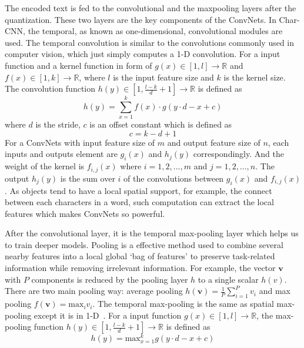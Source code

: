 The encoded text is fed to the convolutional and the maxpooling layers after the quantization. These two layers are the key components of the ConvNets. In Char-CNN, the temporal, as known as one-dimensional, convolutional modules are used. The temporal convolution is similar to the convolutions commonly used in computer vision, which just simply computes a 1-D convolution. For a input function and a kernel function in form of $g(x)\in[1,l] \rightarrow \mathbb{R}$ and $f(x) \in [1,k] \rightarrow \mathbb{R}$, where $l$ is the input feature size and $k$ is the kernel size. The convolution function $h(y) \in [1, \frac{l-k}{d}+1] \rightarrow \mathbb{R}$ is defined as 
\begin{equation}
h(y) = \sum_{x=1}^{k} f(x) \cdot g(y \cdot d -x + c)
\end{equation}
where $d$ is the stride, $c$ is an offset constant which is defined as
\begin{equation}
c = k-d+1
\end{equation}
For a ConvNets with input feature size of $m$ and output feature size of $n$, each inputs and outputs element are $g_i(x)$ and $h_j(y)$ correspondingly. And the weight of the kernel is $f_{i,j}(x)$ where $i=1,2,...,m$ and $j=1,2,...,n$. The output $h_j(y)$ is the sum over $i$ of the convolutions between $g_i(x)$ and $f_{i,j}(x)$.	As objects tend to have a local spatial support, for example, the connect between each characters in a word, such computation can extract the local features which makes ConvNets so powerful.

After the convolutional layer, it is the temporal max-pooling layer which helps us to train deeper models. Pooling is a effective method used to combine several nearby features into a local global `bag of features' to preserve task-related information while removing irrelevant information. For example, the vector $\mathbf{v}$ with $P$ components is reduced by the pooling layer $h$ to a single scalar $h(v)$. There are two main pooling way: average pooling $h(\mathbf{v}) = \frac{1}{P} \sum_{i=1}^P v_i$ and max pooling $f(\mathbf{v}) = \mbox{max}_i v_i$. The temporal max-pooling is the same as spatial max-pooling except it is in 1-D~\cite{boureau2010theoretical}. For a input function $g(x)\in[1,l] \rightarrow \mathbb{R}$, the max-pooling function $h(y) \in [1, \frac{l-k}{d}+1] \rightarrow \mathbb{R}$ is defined as 
\begin{equation}
h(y) = \mbox{max}^{k}_{x=1} g(y\cdot d -x +c)
\end{equation}

